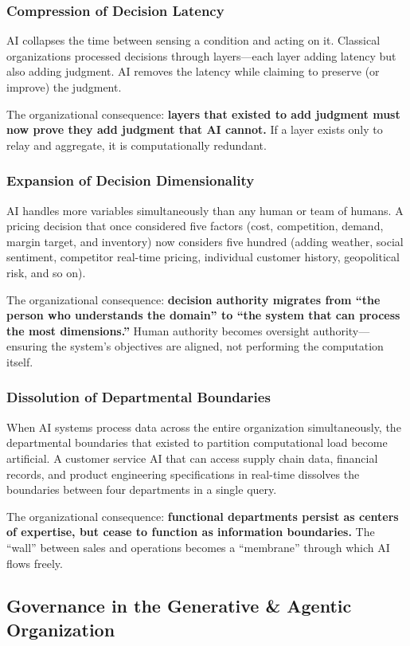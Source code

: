 \documentclass[11pt,a4paper,twocolumn]{article}
\begin{document}
\subsubsection{Compression of Decision Latency}
AI collapses the time between sensing a condition and acting on it. Classical organizations processed decisions through layers---each layer adding latency but also adding judgment. AI removes the latency while claiming to preserve (or improve) the judgment.

The organizational consequence: \textbf{layers that existed to add judgment must now prove they add judgment that AI cannot.} If a layer exists only to relay and aggregate, it is computationally redundant.

\subsubsection{Expansion of Decision Dimensionality}
AI handles more variables simultaneously than any human or team of humans. A pricing decision that once considered five factors (cost, competition, demand, margin target, and inventory) now considers five hundred (adding weather, social sentiment, competitor real-time pricing, individual customer history, geopolitical risk, and so on).

The organizational consequence: \textbf{decision authority migrates from ``the person who understands the domain'' to ``the system that can process the most dimensions.''} Human authority becomes oversight authority---ensuring the system's objectives are aligned, not performing the computation itself.

\subsubsection{Dissolution of Departmental Boundaries}
When AI systems process data across the entire organization simultaneously, the departmental boundaries that existed to partition computational load become artificial. A customer service AI that can access supply chain data, financial records, and product engineering specifications in real-time dissolves the boundaries between four departments in a single query.

The organizational consequence: \textbf{functional departments persist as centers of expertise, but cease to function as information boundaries.} The ``wall'' between sales and operations becomes a ``membrane'' through which AI flows freely.


\subsection{Governance in the Generative \& Agentic Organization}
\end{document}
